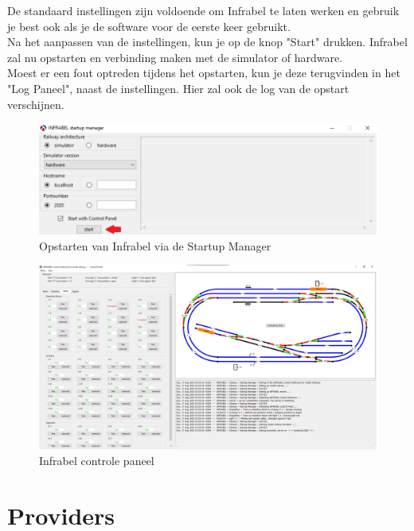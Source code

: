 \documentclass[a4paper, 11pt]{article}
\newcommand{\<}{\scriptsize\textless\normalsize}
\renewcommand{\>}{\scriptsize\textgreater\normalsize}
\begin{document}
De standaard instellingen zijn voldoende om Infrabel te laten werken en gebruik je best ook als je de software voor de eerste keer gebruikt.\\
Na het aanpassen van de instellingen, kun je op de knop "Start" drukken. Infrabel zal nu opstarten en verbinding maken met de simulator of hardware.\\
Moest er een fout optreden tijdens het opstarten, kun je deze terugvinden in het "Log Paneel", naast de instellingen. Hier zal ook de log van de opstart verschijnen.\\
\begin{figure}[h]
	\begin{center}
		\includegraphics[scale=.5]{Bestanden/infrabel-startup-rkt.png}
		\caption{Opstarten van Infrabel via de Startup Manager}
	\end{center}
\end{figure}

\newpage

\begin{figure}[h]
	\begin{center}
		\includegraphics[scale=.35]{Bestanden/infrabel-gui-rkt.png}
		\caption{Infrabel controle paneel}
	\end{center}
\end{figure}


\newpage
\section{Providers} %

\label{lastpage}
\end{document}
